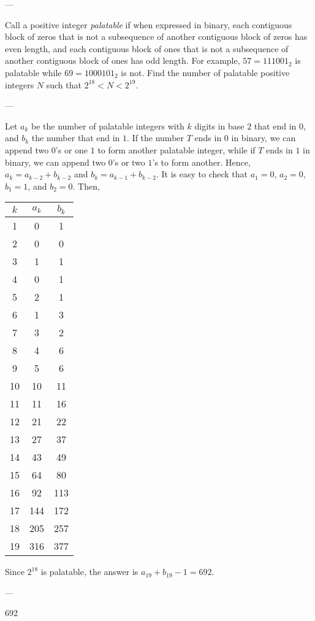 
---

Call a positive integer \textit{palatable} if when expressed in binary, each contiguous block of zeros that is not a subsequence of another contiguous block of zeros has even length, and each contiguous block of ones that is not a subsequence of another contiguous block of ones has odd length. For example, $57=111001_2$ is palatable while $69=1000101_2$ is not. Find the number of palatable positive integers $N$ such that $2^{18}<N<2^{19}$.

---

Let $a_k$ be the number of palatable integers with $k$ digits in base $2$ that end in $0$, and $b_k$ the number that end in $1$. If the number $T$ ends in $0$ in binary, we can append two $0$'s or one $1$ to form another palatable integer, while if $T$ ends in $1$ in binary, we can append two $0$'s or two $1$'s to form another. Hence, $a_k=a_{k-2}+b_{k-2}$ and $b_k=a_{k-1}+b_{k-2}$. It is easy to check that $a_1=0$, $a_2=0$, $b_1=1$, and $b_2=0$. Then,
\begin{center}
    \begin{tabular}{c|c|c}
        $k$ & $a_k$ & $b_k$ \\ \hline
        1 & 0 & 1 \\
        2 & 0 & 0 \\
        3 & 1 & 1 \\
        4 & 0 & 1 \\
        5 & 2 & 1 \\
        6 & 1 & 3 \\
        7 & 3 & 2 \\
        8 & 4 & 6 \\
        9 & 5 & 6 \\
        10 & 10 & 11 \\
        11 & 11 & 16 \\
        12 & 21 & 22 \\
        13 & 27 & 37 \\
        14 & 43 & 49 \\
        15 & 64 & 80 \\
        16 & 92 & 113 \\
        17 & 144 & 172 \\
        18 & 205 & 257 \\
        19 & 316 & 377
    \end{tabular}
\end{center}
Since $2^{18}$ is palatable, the answer is $a_{19}+b_{19}-1=692$.

---

692
